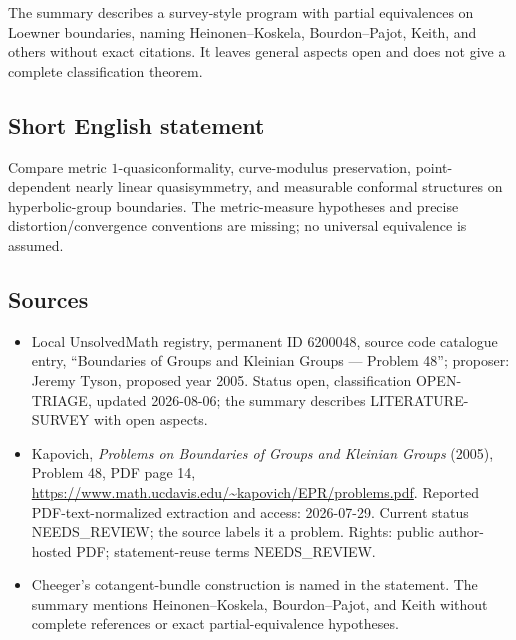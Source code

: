 \documentclass[11pt]{article}
\begin{document}
The summary describes a survey-style program with partial equivalences on Loewner boundaries, naming Heinonen--Koskela, Bourdon--Pajot, Keith, and others without exact citations. It leaves general aspects open and does not give a complete classification theorem.
\subsection{Short English statement}
Compare metric $1$-quasiconformality, curve-modulus preservation, point-dependent nearly linear quasisymmetry, and measurable conformal structures on hyperbolic-group boundaries. The metric-measure hypotheses and precise distortion/convergence conventions are missing; no universal equivalence is assumed.
\subsection{Sources}
\begin{itemize}
\item Local UnsolvedMath registry, permanent ID 6200048, source code catalogue entry, ``Boundaries of Groups and Kleinian Groups --- Problem 48''; proposer: Jeremy Tyson, proposed year 2005. Status open, classification OPEN-TRIAGE, updated 2026-08-06; the summary describes LITERATURE-SURVEY with open aspects.
\item Kapovich, \emph{Problems on Boundaries of Groups and Kleinian Groups} (2005), Problem 48, PDF page 14, \url{https://www.math.ucdavis.edu/~kapovich/EPR/problems.pdf}. Reported PDF-text-normalized extraction and access: 2026-07-29. Current status NEEDS\_REVIEW; the source labels it a problem. Rights: public author-hosted PDF; statement-reuse terms NEEDS\_REVIEW.
\item Cheeger's cotangent-bundle construction is named in the statement. The summary mentions Heinonen--Koskela, Bourdon--Pajot, and Keith without complete references or exact partial-equivalence hypotheses.
\end{itemize}
\end{document}
